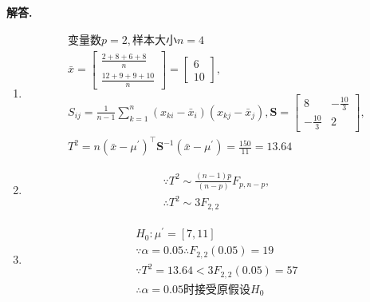 \documentclass[12pt, a4paper, oneside]{ctexart}
\newenvironment{solution}{\par\noindent\textbf{解答. }}{\par}
\begin{document}
\begin{solution}
    \begin{enumerate}[label=(\alph*)]
        \item 
        \begin{gather*}
            \text{变量数}p=2,\text{样本大小}n=4\\
            \bar{x}=\begin{bmatrix}
                \frac{2+8+6+8}{n}\\
                \frac{12+9+9+10}{n}
            \end{bmatrix}
            =\begin{bmatrix}
                6\\
                10
            \end{bmatrix},\\
            S_{ij} = \frac{1}{n-1} \sum_{k=1}^{n} (x_{ki} - \bar{x}_i)(x_{kj} - \bar{x}_j) ,
            \mathbf{S}=\begin{bmatrix}
                8 & -\frac{10}{3}\\
                -\frac{10}{3} & 2
            \end{bmatrix},\\
            T^{2}=n(\bar{x} - \mu^\prime)^\top \mathbf{S}^{-1} (\bar{x} - \mu^\prime)=\frac{150}{11}=13.64
        \end{gather*}
        \item 
        \begin{gather*}
            \because T^{2} \sim \frac{( n-1 ) p} {( n-p )} F_{p, n-p},\\
            \therefore T^{2} \sim 3F_{2,2}
        \end{gather*}
        \item 
        \begin{gather*}
            H_{0} \colon \mu^{\prime}= [7,11]\\
            \because \alpha=0.05 \therefore F_{2,2}(0.05)=19\\
            \because T^{2}=13.64<3F_{2,2}(0.05)=57\\
            \therefore \alpha=0.05\text{时接受原假设} H_{0}
        \end{gather*}

      \end{enumerate}
\end{solution}
\end{document}
